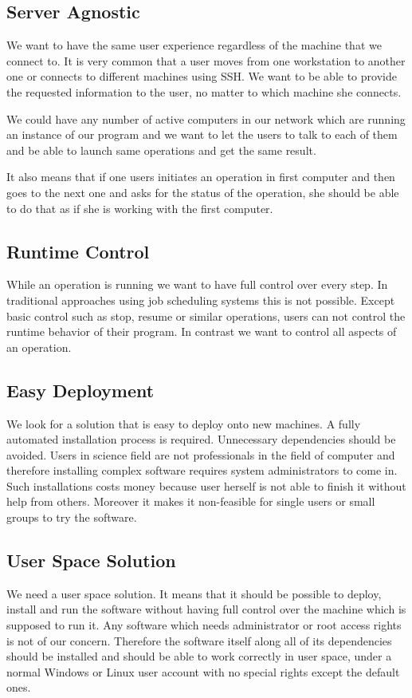 \subsection{Server Agnostic}
We want to have the same user experience regardless of the machine that we connect to. It is very common
that a user moves from one workstation to another one or connects to different machines using SSH. We 
want to be able to provide the requested information to the user, no matter to which machine she connects.

We could have any number of active computers in our network which are running an instance of our program
and we want to let the users to talk to each of them and be able to launch same operations and get the same result.

It also means that if one users initiates an operation in first computer and then goes to the next one and asks
for the status of the operation, she should be able to do that as if she is working with the first computer.

\subsection{Runtime Control}
While an operation is running we want to have full control over every step. In traditional approaches using job
scheduling systems this is not possible. Except basic control such as stop, resume or similar operations, users
can not control the runtime behavior of their program. In contrast we want to control all aspects of an operation.

\subsection{Easy Deployment}
We look for a solution that is easy to deploy onto new machines. A fully automated installation process
is required. Unnecessary dependencies should be avoided. Users in science field are not professionals in the field
of computer and therefore installing complex software requires system administrators to come in. Such installations
costs money because user herself is not able to finish it without help from others. Moreover it makes it non-feasible
for single users or small groups to try the software.

\subsection{User Space Solution}
We need a user space solution. It means that it should be possible to deploy, install and run the software without
having full control over the machine which is supposed to run it. Any software which needs administrator or root access
rights is not of our concern. Therefore the software itself along all of its dependencies should be installed and should
be able to work correctly in user space, under a normal Windows or Linux user account with no special rights except the
default ones.


